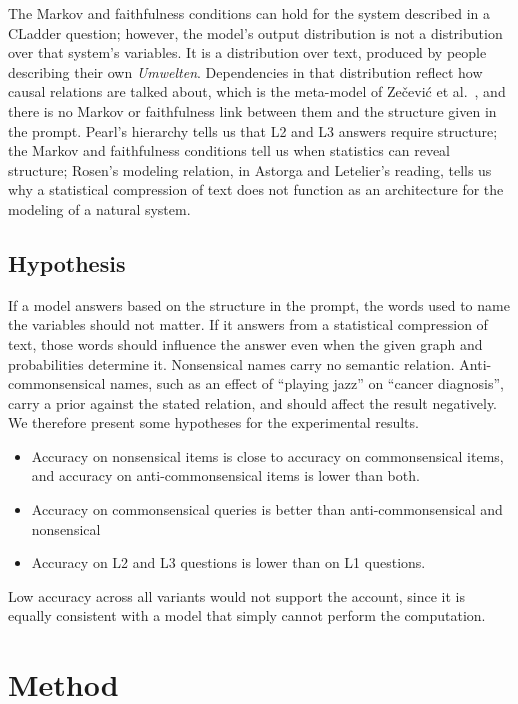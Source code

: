 \documentclass{llncs}
\begin{document}
The Markov and faithfulness conditions can hold for the system described in a CLadder question; however, the model's output distribution is not a distribution over that system's variables. It is a distribution over text, produced by people describing their own \textit{Umwelten}. Dependencies in that distribution reflect how causal relations are talked about, which is the meta-model of Zečević et al.\ \cite{Zecevic2023CausalPL}, and there is no Markov or faithfulness link between them and the structure given in the prompt. Pearl's hierarchy tells us that L2 and L3 answers require structure; the Markov and faithfulness conditions tell us when statistics can reveal structure; Rosen's modeling relation, in Astorga and Letelier's reading, tells us why a statistical compression of text does not function as an architecture for the modeling of a natural system. 

\subsection{Hypothesis}
\label{sec:predictions}

If a model answers based on the structure in the prompt, the words used to name the variables should not matter. If it answers from a statistical compression of text, those words should influence the answer even when the given graph and probabilities determine it. Nonsensical names carry no semantic relation. Anti-commonsensical names, such as an effect of ``playing jazz'' on ``cancer diagnosis'', carry a prior against the stated relation, and should affect the result negatively. We therefore present some hypotheses for the experimental results. 

\begin{itemize}
\item[\textbf{H1}] Accuracy on nonsensical items is close to accuracy on commonsensical items, and accuracy on anti-commonsensical items is lower than both.
\item[\textbf{H1b}] Accuracy on commonsensical queries is better than anti-commonsensical and  nonsensical
\item[\textbf{H2}] Accuracy on L2 and L3 questions is lower than on L1 questions. 
\end{itemize}

Low accuracy across all variants would not support the account, since it is equally consistent with a model that simply cannot perform the computation.

\section{Method}
\label{sec:method}
\end{document}

